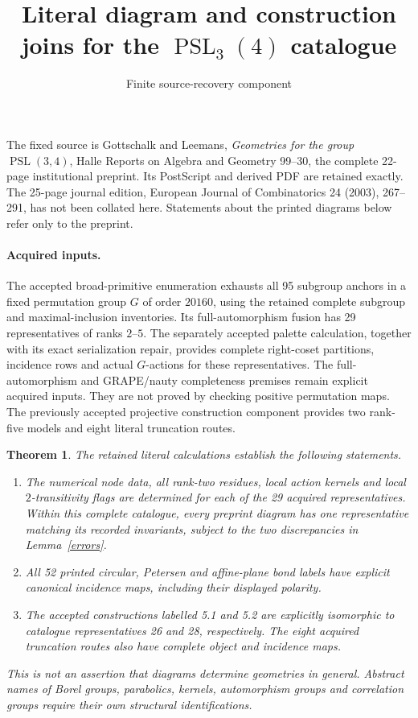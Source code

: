 \documentclass[10pt]{article}
\title{Literal diagram and construction joins for the $\operatorname{PSL}_3(4)$ catalogue}
\author{Finite source-recovery component}\date{}
\newtheorem{theorem}{Theorem}\newtheorem{lemma}{Lemma}
\begin{document}
\maketitle
\noindent
The fixed source is Gottschalk and Leemans, \emph{Geometries for the group
$\operatorname{PSL}(3,4)$}, Halle Reports on Algebra and Geometry 99--30,
the complete 22-page institutional preprint.  Its PostScript and derived PDF
are retained exactly.  The 25-page journal edition, European Journal of
Combinatorics 24 (2003), 267--291, has not been collated here.  Statements about
the printed diagrams below refer only to the preprint.

\paragraph{Acquired inputs.}
The accepted broad-primitive enumeration exhausts all 95 subgroup anchors in a
fixed permutation group $G$ of order $20160$, using the retained complete
subgroup and maximal-inclusion inventories.  Its full-automorphism fusion has
29 representatives of ranks $2$--$5$.  The separately accepted palette
calculation, together with its exact serialization repair, provides complete
right-coset partitions, incidence rows and actual $G$-actions for these
representatives.  The full-automorphism and GRAPE/nauty completeness premises
remain explicit acquired inputs.  They are not proved by checking positive
permutation maps.  The previously accepted projective construction component
provides two rank-five models and eight literal truncation routes.

\begin{theorem}
The retained literal calculations establish the following statements.
\begin{enumerate}
\item The numerical node data, all rank-two residues, local action kernels
and local $2$-transitivity flags are determined for each of the 29 acquired
representatives.  Within this complete catalogue, every preprint diagram has
one representative matching its recorded invariants, subject to the two
discrepancies in Lemma~\ref{errors}.
\item All 52 printed circular, Petersen and affine-plane bond labels have
explicit canonical incidence maps, including their displayed polarity.
\item The accepted constructions labelled 5.1 and 5.2 are explicitly isomorphic
to catalogue representatives 26 and 28, respectively.  The eight acquired
truncation routes also have complete object and incidence maps.
\end{enumerate}
This is not an assertion that diagrams determine geometries in general.
Abstract names of Borel groups, parabolics, kernels, automorphism groups and
correlation groups require their own structural identifications.
\end{theorem}
\end{document}
